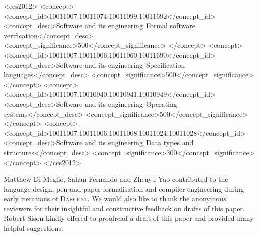 \documentclass[acmsmall,screen]{acmart}
\newcommand{\Dargent}{\textsc{Dargent}\xspace}
\newcommand{\dargent}{\Dargent}
\begin{document}
\begin{CCSXML}
<ccs2012>
   <concept>
       <concept_id>10011007.10011074.10011099.10011692</concept_id>
       <concept_desc>Software and its engineering~Formal software verification</concept_desc>
       <concept_significance>500</concept_significance>
       </concept>
   <concept>
       <concept_id>10011007.10011006.10011060.10011690</concept_id>
       <concept_desc>Software and its engineering~Specification languages</concept_desc>
       <concept_significance>500</concept_significance>
       </concept>
   <concept>
       <concept_id>10011007.10010940.10010941.10010949</concept_id>
       <concept_desc>Software and its engineering~Operating systems</concept_desc>
       <concept_significance>500</concept_significance>
       </concept>
   <concept>
       <concept_id>10011007.10011006.10011008.10011024.10011028</concept_id>
       <concept_desc>Software and its engineering~Data types and structures</concept_desc>
       <concept_significance>300</concept_significance>
       </concept>
 </ccs2012>
\end{CCSXML}




\maketitle

\renewcommand{\shortauthors}{Z. Chen, A. Lafont, L. O'Connor, G. Keller, C. McLaughlin, V. Jackson, and C. Rizkallah}












\begin{acks}
Matthew Di Meglio, Sahan Fernando and Zhenyu Yao contributed to the language
design, pen-and-paper formalisation and compiler engineering during early
iterations of \dargent. We would also like to thank the anonymous reviewers
for their insightful and constructive feedback on drafts of this paper.
Robert Sison kindly offered to proofread a draft of this paper and provided many
helpful suggestions.
\end{acks}




\end{document}
